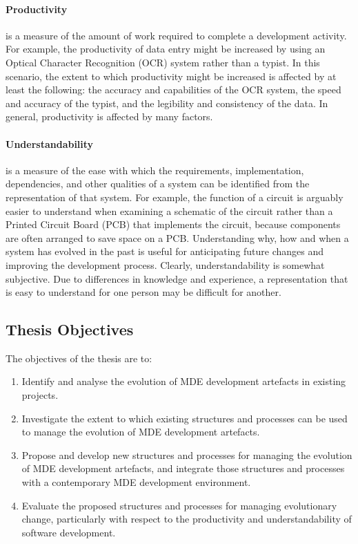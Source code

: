 \paragraph{Productivity} is a measure of the amount of work required to complete a development activity. For example, the productivity of data entry might be increased by using an Optical Character Recognition (OCR) system rather than a typist. In this scenario, the extent to which productivity might be increased is affected by at least the following: the accuracy and capabilities of the OCR system, the speed and accuracy of the typist, and the legibility and consistency of the data. In general, productivity is affected by many factors.


\paragraph{Understandability} is a measure of the ease with which the requirements, implementation, dependencies, and other qualities of a system can be identified from the representation of that system. For example, the function of a circuit is arguably easier to understand when examining a schematic of the circuit rather than a Printed Circuit Board (PCB) that implements the circuit, because components are often arranged to save space on a PCB. Understanding why, how and when a system has evolved in the past is useful for anticipating future changes and improving the development process. Clearly, understandability is somewhat subjective. Due to differences in knowledge and experience, a representation that is easy to understand for one person may be difficult for another. 


\subsection{Thesis Objectives}
The objectives of the thesis are to:

\begin{enumerate}
	\item Identify and analyse the evolution of MDE development artefacts in existing projects.
	\item Investigate the extent to which existing structures and processes can be used to manage the evolution of MDE development artefacts. 
	\item Propose and develop new structures and processes for managing the evolution of MDE development artefacts, and integrate those structures and processes with a contemporary MDE development environment.
	\item Evaluate the proposed structures and processes for managing evolutionary change, particularly with respect to the productivity and understandability of software development.
\end{enumerate}
